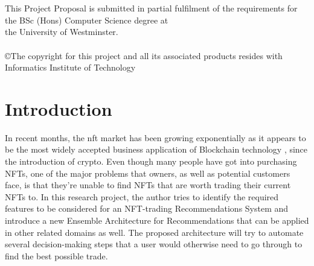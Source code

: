 \documentclass[a4paper, 12pt, oneside]{report}
\begin{document}
\begin{titlepage}
\begin{center}
\\[0.1cm]
\\[1cm]


\vfill
\large{This Project Proposal is submitted in partial fulfilment of the requirements for \\the BSc (Hons) Computer Science degree at \\the University of Westminster.} \\[0.1cm]

\vfill
{}\\[0.1cm]

\vfill
\large{\copyright The copyright for this project and all its associated products resides with Informatics Institute of Technology} \\[0.5cm]
 

 
\end{center}
 
\end{titlepage}


\tableofcontents

{\let\clearpage\relax
\listoffigures}
{\let\clearpage\relax
\listoftables}
{\let\clearpage\relax
\printglossary[type=\acronymtype
]}


\onehalfspacing %

\chapter{Introduction}

\setcounter{page}{1} %

In recent months, the \Gls{nft} market has been growing exponentially as it appears to be the most widely accepted business application of Blockchain technology \autocite{dowling_is_2021}, since the introduction of crypto. Even though many people have got into purchasing NFTs, one of the major problems that owners, as well as potential customers face, is that they’re unable to find NFTs that are worth trading their current NFTs to. In this research project, the author tries to identify the required features to be considered for an NFT-trading Recommendations System and introduce a new Ensemble Architecture for Recommendations that can be applied in other related domains as well. The proposed architecture will try to automate several decision-making steps that a user would otherwise need to go through to find the best possible trade.
\end{document}
